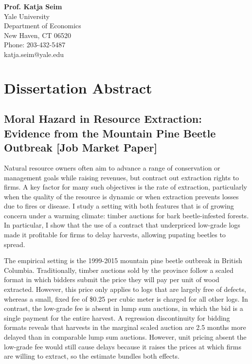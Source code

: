 \documentclass[11pt,letterpaper]{article}
\begin{document}
\vspace{0.5cm}

\noindent \textbf{Prof. Katja Seim} \\
Yale University \\
Department of Economics \\
New Haven, CT 06520 \\
Phone: 203-432-5487 \\
katja.seim@yale.edu

\section*{Dissertation Abstract}

\subsection*{Moral Hazard in Resource Extraction: Evidence from the Mountain Pine Beetle Outbreak [Job Market Paper]}

Natural resource owners often aim to advance a range of conservation or management goals while raising revenues, but contract out extraction rights to firms. A key factor for many such objectives is the rate of extraction, particularly when the quality of the resource is dynamic or when extraction prevents losses due to fires or disease. I study a setting with both features that is of growing concern under a warming climate: timber auctions for bark beetle-infested forests. In particular, I show that the use of a contract that underpriced low-grade logs made it profitable for firms to delay harvests, allowing pupating beetles to spread.

The empirical setting is the 1999-2015 mountain pine beetle outbreak in British Columbia. Traditionally, timber auctions sold by the province follow a scaled format in which bidders submit the price they will pay per unit of wood extracted. However, this price only applies to logs that are largely free of defects, whereas a small, fixed fee of \$0.25 per cubic meter is charged for all other logs. In contrast, the low-grade fee is absent in lump sum auctions, in which the bid is a single payment for the entire harvest. A regression discontinuity for bidding formats reveals that harvests in the marginal scaled auction are 2.5 months more delayed than in comparable lump sum auctions. However, unit pricing absent the low-grade fee would still cause delays because it raises the prices at which firms are willing to extract, so the estimate bundles both effects.
\end{document}
